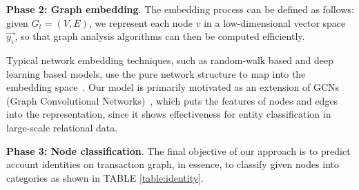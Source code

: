 
\textbf{Phase 2: Graph embedding}.
The embedding process can be defined as follows: given $G_{t}=(V,E)$, we represent each node $v$ in a low-dimensional vector space $\vec{y_v}$, so that graph analysis algorithms can then be computed efficiently.

Typical network embedding techniques, such as random-walk based and deep learning based models, use the pure network structure to map into the embedding space~\cite{goyal2018capturing}. Our model is primarily motivated as an extension of GCNs (Graph Convolutional Networks)~\cite{kipf2016semi,schlichtkrull2018modeling}, which puts the features of nodes and edges into the representation, since it shows effectiveness for entity classification in large-scale relational data.







\textbf{Phase 3: Node classification}.
The final objective of our approach is to predict account identities on transaction graph, in essence, to classify given nodes into categories as shown in TABLE \ref{table:identity}.

